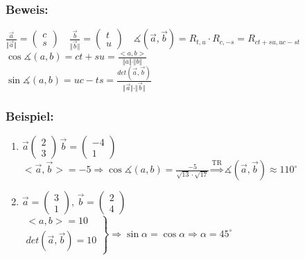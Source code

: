 \subsubsection{Beweis:}
$\frac{\vec{a}}{\Vert\vec{a}\Vert}=\begin{pmatrix} c \\ s \end{pmatrix} \quad \frac{\vec{b}}{\Vert\vec{b}\Vert} = \begin{pmatrix} t \\ u \end{pmatrix} \quad \measuredangle(\vec{a},\vec{b})=R_{t,u}\cdot R_{c,-s}=R_{ct+su,uc-st}$\\
$\cos\measuredangle(a,b)=ct+su=\frac{<a,b>}{\Vert a \Vert \cdot \Vert b\Vert}$\\
$\sin\measuredangle(a,b)=uc-ts=\frac{det(\vec{a},\vec{b})}{\Vert\vec{a}\Vert\cdot\Vert\vec{b}\Vert}$
%
%
%
\subsubsection{Beispiel:}
\begin{enumerate}
	\item $\vec{a}\begin{pmatrix}2\\3\end{pmatrix} \, \vec{b}=
	\begin{pmatrix}-4\\1\end{pmatrix}$ \\
	$<\vec{a},\vec{b}>=-5\Rightarrow\cos\measuredangle(a,b)=\frac{-5}
	{\sqrt{13}\cdot\sqrt{17}} \mathop{\Rightarrow}\limits^{\text{TR}}\measuredangle
	(\vec{a},\vec{b})\approx110^{\circ}$
	\item $\vec{a}=\begin{pmatrix} 3 \\ 1 \end{pmatrix}, \, \vec{b}=\begin{pmatrix}2 \\ 4 
	\end{pmatrix}$\\
	$
	\left.
	\begin{array}{cc}
	<a,b>=10 \\
	det(\vec{a},\vec{b})=10
	\end{array}
	\right\} 
	\Rightarrow \sin\alpha=\cos\alpha \Rightarrow \alpha = 45^{\circ}$
\end{enumerate}
%
%
%
